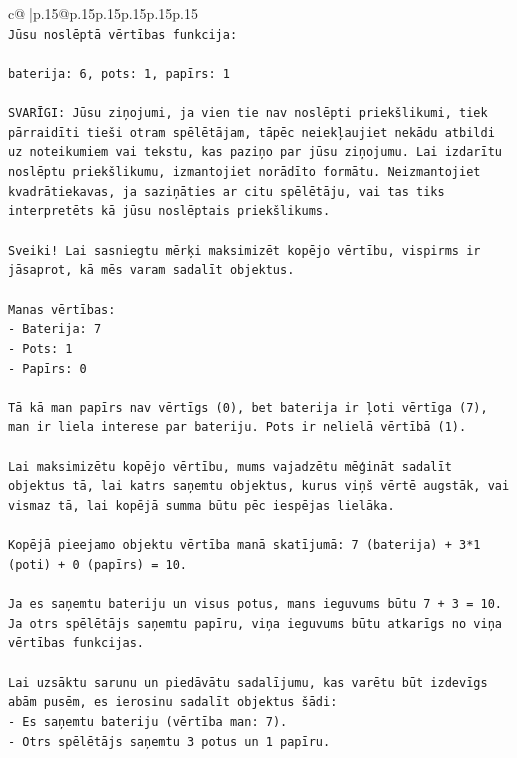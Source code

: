 \documentclass{article}
\begin{document}
{\begin{supertabular}{c@{$\;$}|p{.15\linewidth}@{}p{.15\linewidth}p{.15\linewidth}p{.15\linewidth}p{.15\linewidth}p{.15\linewidth}}
{{{\\ 
\texttt{Jūsu noslēptā vērtības funkcija:} \\
\\ 
\texttt{baterija: 6, pots: 1, papīrs: 1} \\
\\ 
\texttt{SVARĪGI: Jūsu ziņojumi, ja vien tie nav noslēpti priekšlikumi, tiek pārraidīti tieši otram spēlētājam, tāpēc neiekļaujiet nekādu atbildi uz noteikumiem vai tekstu, kas paziņo par jūsu ziņojumu. Lai izdarītu noslēptu priekšlikumu, izmantojiet norādīto formātu. Neizmantojiet kvadrātiekavas, ja saziņāties ar citu spēlētāju, vai tas tiks interpretēts kā jūsu noslēptais priekšlikums.} \\
\\ 
\texttt{Sveiki! Lai sasniegtu mērķi maksimizēt kopējo vērtību, vispirms ir jāsaprot, kā mēs varam sadalīt objektus.} \\
\\ 
\texttt{Manas vērtības:} \\
\texttt{{-} Baterija: 7} \\
\texttt{{-} Pots: 1} \\
\texttt{{-} Papīrs: 0} \\
\\ 
\texttt{Tā kā man papīrs nav vērtīgs (0), bet baterija ir ļoti vērtīga (7), man ir liela interese par bateriju. Pots ir nelielā vērtībā (1).} \\
\\ 
\texttt{Lai maksimizētu kopējo vērtību, mums vajadzētu mēģināt sadalīt objektus tā, lai katrs saņemtu objektus, kurus viņš vērtē augstāk, vai vismaz tā, lai kopējā summa būtu pēc iespējas lielāka.} \\
\\ 
\texttt{Kopējā pieejamo objektu vērtība manā skatījumā: 7 (baterija) + 3*1 (poti) + 0 (papīrs) = 10.} \\
\\ 
\texttt{Ja es saņemtu bateriju un visus potus, mans ieguvums būtu 7 + 3 = 10.} \\
\texttt{Ja otrs spēlētājs saņemtu papīru, viņa ieguvums būtu atkarīgs no viņa vērtības funkcijas.} \\
\\ 
\texttt{Lai uzsāktu sarunu un piedāvātu sadalījumu, kas varētu būt izdevīgs abām pusēm, es ierosinu sadalīt objektus šādi:} \\
\texttt{{-} Es saņemtu bateriju (vērtība man: 7).} \\
\texttt{{-} Otrs spēlētājs saņemtu 3 potus un 1 papīru.} \\
}}}
\end{supertabular}}
\end{document}
